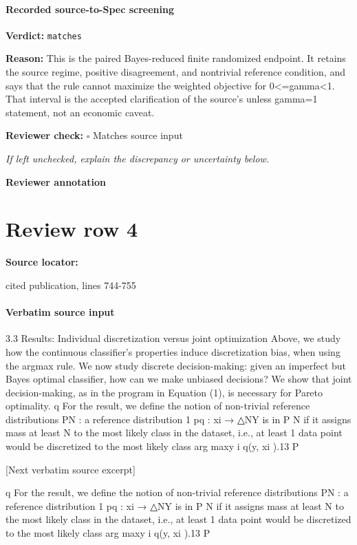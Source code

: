 \documentclass[10pt]{article}
\newcommand{\reviewerbox}{%
  \par\noindent\fbox{\parbox{0.96\linewidth}{\rule{0pt}{0.38in}}}\par
}
\newcommand{\reviewmatch}[1]{%
  \par\noindent\textbf{Reviewer check:} $\square$\; #1\par
  \noindent\emph{If left unchecked, explain the discrepancy or uncertainty below.}\par
}
\begin{document}
\paragraph{Recorded source-to-Spec screening}
\textbf{Verdict:} \texttt{matches}
\\
{\raggedright
\textbf{Reason:} This is the paired Bayes-\allowbreak{}reduced finite randomized endpoint.\allowbreak{} It retains the source regime, positive disagreement, and nontrivial reference condition, and says that the rule cannot maximize the weighted objective for 0<=gamma<1.\allowbreak{} That interval is the accepted clarification of the source's unless gamma=1 statement, not an economic caveat.\allowbreak{}
\par}
\reviewmatch{Matches source input}
\noindent\textbf{Reviewer annotation}\par
\reviewerbox
\clearpage
\hypertarget{source-claim-4662dc8e8bb960d7}{}
\section*{Review row 4}
\textbf{Source locator:} {\footnotesize\raggedright cited publication, lines 744-\allowbreak{}755\par}
\paragraph{Verbatim source input}
\begin{ReviewVerbatim}
3.3     Results: Individual discretization versus joint optimization
Above, we study how the continuous classifier’s properties induce discretization bias, when using the argmax
rule. We now study discrete decision-making: given an imperfect but Bayes optimal classifier, how can
we make unbiased decisions? We show that joint decision-making, as in the program in Equation (1), is
necessary for Pareto optimality.
                                                                                     q
    For the result, we define the notion of non-trivial reference distributions PN     : a reference distribution
                                                       1
pq : {xi } → △NY is in P N if it assigns mass at least N to the most likely class in the  dataset, i.e., at least 1
data point would be discretized to the most likely class arg maxy i q(y, xi ).13
                                                                   P


[Next verbatim source excerpt]

                                                                                     q
    For the result, we define the notion of non-trivial reference distributions PN     : a reference distribution
                                                       1
pq : {xi } → △NY is in P N if it assigns mass at least N to the most likely class in the  dataset, i.e., at least 1
data point would be discretized to the most likely class arg maxy i q(y, xi ).13
                                                                   P
\end{ReviewVerbatim}
\end{document}
